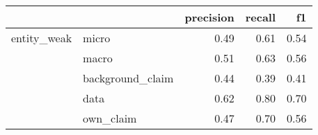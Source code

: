 \begin{tabular}{llrrr}
\toprule
            &           &  precision &  recall &   f1 \\
\midrule
entity\_weak & micro &       0.49 &    0.61 & 0.54 \\
            & macro &       0.51 &    0.63 & 0.56 \\
            & background\_claim &       0.44 &    0.39 & 0.41 \\
            & data &       0.62 &    0.80 & 0.70 \\
            & own\_claim &       0.47 &    0.70 & 0.56 \\
\bottomrule
\end{tabular}
